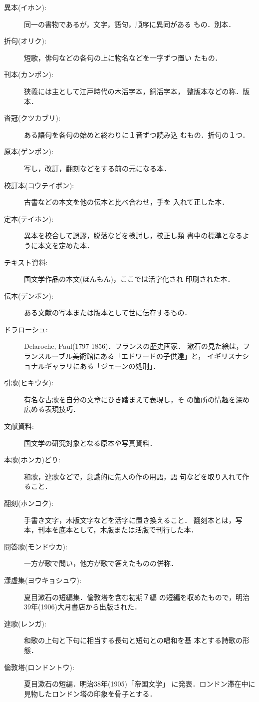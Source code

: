 \begin{description}
\item[異本(イホン):] 同一の書物であるが，文字，語句，順序に異同がある
もの．別本．
\item[折句(オリク):] 短歌，俳句などの各句の上に物名などを一字ずつ置い
たもの．
\item[刊本(カンポン):] 狭義には主として江戸時代の木活字本，銅活字本，
整版本などの称．版本．
\item[沓冠(クツカブリ):] ある語句を各句の始めと終わりに１音ずつ読み込
むもの．折句の１つ．
\item[原本(ゲンポン):] 写し，改訂，翻刻などをする前の元になる本．
\item[校訂本(コウテイボン):]古書などの本文を他の伝本と比べ合わせ，手を
入れて正した本．
\item[定本(テイホン):] 異本を校合して誤謬，脱落などを検討し，校正し類
書中の標準となるように本文を定めた本．
\item[テキスト資料:] 国文学作品の本文(ほんもん)，ここでは活字化され
印刷された本．
\item[伝本(デンポン):] ある文献の写本または版本として世に伝存するもの．
\item[ドラローシュ:] Delaroche, Paul(1797-1856)．フランスの歴史画家．
漱石の見た絵は，フランスルーブル美術館にある「エドワードの子供達」と，
イギリスナショナルギャラリにある「ジェーンの処刑」．
\item[引歌(ヒキウタ):] 有名な古歌を自分の文章にひき踏まえて表現し，そ
の箇所の情趣を深め広める表現技巧．
\item[文献資料:] 国文学の研究対象となる原本や写真資料．
\item[本歌(ホンカ)どり:] 和歌，連歌などで，意識的に先人の作の用語，語
句などを取り入れて作ること．
\item[翻刻(ホンコク):] 手書き文字，木版文字などを活字に置き換えること．
翻刻本とは，写本，刊本を底本として，木版または活版で刊行した本．
\item[問答歌(モンドウカ):] 一方が歌で問い，他方が歌で答えたものの併称．
\item[漾虚集(ヨウキョシュウ):] 夏目漱石の短編集．倫敦塔を含む初期７編
の短編を収めたもので，明治39年(1906)大月書店から出版された．
\item[連歌(レンガ):] 和歌の上句と下句に相当する長句と短句との唱和を基
本とする詩歌の形態．
\item[倫敦塔(ロンドントウ):] 夏目漱石の短編．明治38年(1905)「帝国文学」
に発表．ロンドン滞在中に見物したロンドン塔の印象を骨子とする．
\end{description}


